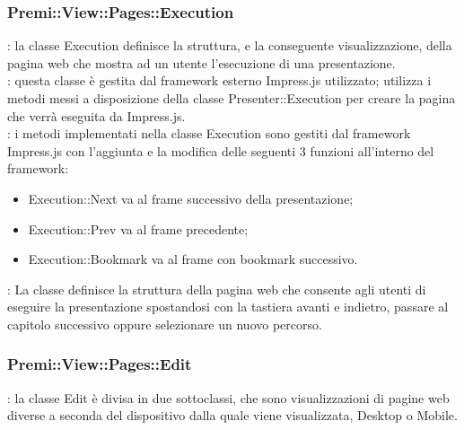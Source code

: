 {		\subsubsection{Premi::View::Pages::Execution}{
			\textbf{\tipo}: la classe Execution definisce la struttura, e la conseguente visualizzazione, della pagina web che mostra ad un utente l'esecuzione di una presentazione.\\
			\textbf{\relaz}: questa classe è gestita dal framework esterno Impress.js utilizzato; utilizza i metodi messi a disposizione della classe Presenter::Execution per creare la pagina che verrà eseguita da Impress.js.\\
			\textbf{\interfacce}: i metodi implementati nella classe Execution sono gestiti dal framework Impress.js con l'aggiunta e la modifica delle seguenti 3 funzioni all'interno del framework:
			\begin{itemize}
				\item Execution::Next va al frame successivo della presentazione;
				\item Execution::Prev va al frame precedente;
				\item Execution::Bookmark va al frame con bookmark successivo.
			\end{itemize}
			\textbf{\attivita}: La classe definisce la struttura della pagina web che consente agli utenti di eseguire la presentazione spostandosi con la tastiera avanti e indietro, passare al capitolo successivo oppure selezionare un nuovo percorso.\\
		}
		\subsubsection{Premi::View::Pages::Edit}{
			\textbf{\tipo}: la classe Edit è divisa in due sottoclassi, che sono visualizzazioni di pagine web diverse a seconda del dispositivo dalla quale viene visualizzata, Desktop o Mobile.\\
		}
}
